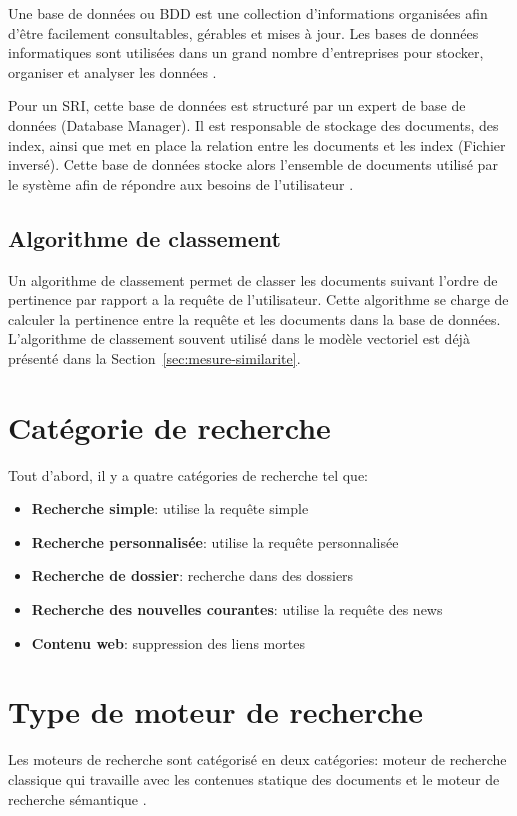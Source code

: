 \begin{definition}
	Une base de données ou BDD est une collection d’informations organisées afin d’être facilement consultables, gérables et mises à jour. Les bases de données informatiques sont utilisées dans un grand nombre d’entreprises pour stocker, organiser et analyser les données \citep{lebigdata}.
\end{definition}

Pour un SRI, cette base de données est structuré par un expert de base de données (Database Manager). Il est responsable de stockage des documents, des index, ainsi que met en place la relation entre les documents et les index (Fichier inversé). Cette base de données stocke alors l'ensemble de documents utilisé par le système afin de répondre aux besoins de l'utilisateur \citep{vsm-for-arabic-language}.

\subsection{Algorithme de classement}
Un algorithme de classement permet de classer les documents suivant l'ordre de pertinence par rapport a la requête de l'utilisateur. Cette algorithme se charge de calculer la pertinence entre la requête et les documents dans la base de données. L'algorithme de classement souvent utilisé dans le modèle vectoriel est déjà présenté dans la Section~\ref{sec:mesure-similarite}.

\section{Catégorie de recherche}
Tout d'abord, il y a quatre catégories de recherche \citep{ir-on-web} tel que:
\begin{itemize}
	\item \textbf{Recherche simple}: utilise la requête simple
	\item \textbf{Recherche personnalisée}: utilise la requête personnalisée
	\item \textbf{Recherche de dossier}: recherche dans des dossiers
	\item \textbf{Recherche des nouvelles courantes}: utilise la requête des news
	\item \textbf{Contenu web}: suppression des liens mortes
\end{itemize}

\section{Type de moteur de recherche}
Les moteurs de recherche sont catégorisé en deux catégories: moteur de recherche classique qui travaille avec les contenues statique des documents et le moteur de recherche sémantique \citep*{approche-semantique,thesaurus-ir-web}.

